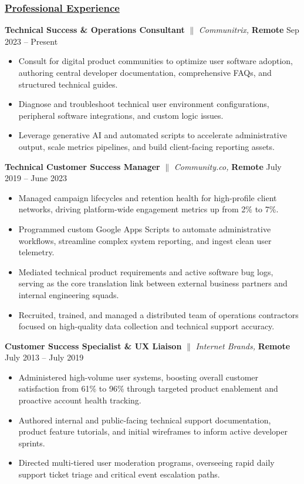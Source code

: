 \documentclass[a4paper,10pt]{article}
\begin{document}
\subsubsection{\underline{Professional Experience}}
{\textbf{Technical Success \& Operations Consultant} {$\parallel$} \textit{Communitrix,}  \textbf{Remote} \hfill {Sep 2023 – Present}}
\begin{itemize}
      \item Consult for digital product communities to optimize user software adoption, authoring central developer documentation, comprehensive FAQs, and structured technical guides.
      \item Diagnose and troubleshoot technical user environment configurations, peripheral software integrations, and custom logic issues.
      \item Leverage generative AI and automated scripts to accelerate administrative output, scale metrics pipelines, and build client-facing reporting assets.
\end{itemize}
\vspace{1.5mm}
{\textbf{Technical Customer Success Manager} {$\parallel$} \textit{Community.co,}  \textbf{Remote} \hfill {July 2019 – June 2023}}
\begin{itemize}
      \item Managed campaign lifecycles and retention health for high-profile client networks, driving platform-wide engagement metrics up from 2\% to 7\%.
      \item Programmed custom Google Apps Scripts to automate administrative workflows, streamline complex system reporting, and ingest clean user telemetry.
      \item Mediated technical product requirements and active software bug logs, serving as the core translation link between external business partners and internal engineering squads.
      \item Recruited, trained, and managed a distributed team of operations contractors focused on high-quality data collection and technical support accuracy.
\end{itemize}
\vspace{1.5mm}
{\textbf{Customer Success Specialist \& UX Liaison} {$\parallel$} \textit{Internet Brands,}  \textbf{Remote} \hfill {July 2013 – July 2019}}
\begin{itemize}
      \item Administered high-volume user systems, boosting overall customer satisfaction from 61\% to 96\% through targeted product enablement and proactive account health tracking.
      \item Authored internal and public-facing technical support documentation, product feature tutorials, and initial wireframes to inform active developer sprints.
      \item Directed multi-tiered user moderation programs, overseeing rapid daily support ticket triage and critical event escalation paths.
\end{itemize}
\end{document}
